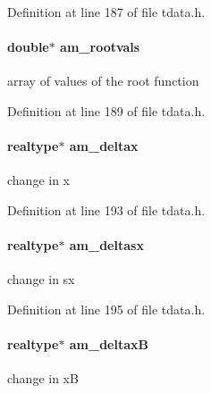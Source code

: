 Definition at line 187 of file tdata.\+h.

\hypertarget{struct_temp_data_a9cf09c47af8f82be3bba711720009efe}{}
\paragraph[{am\+\_\+rootvals}]{\setlength{\rightskip}{0pt plus 5cm}double$\ast$ am\+\_\+rootvals}\label{struct_temp_data_a9cf09c47af8f82be3bba711720009efe}
array of values of the root function 

Definition at line 189 of file tdata.\+h.

\hypertarget{struct_temp_data_ab432281618cfe0f7dd7db1d8eb5ec227}{}
\paragraph[{am\+\_\+deltax}]{\setlength{\rightskip}{0pt plus 5cm}realtype$\ast$ am\+\_\+deltax}\label{struct_temp_data_ab432281618cfe0f7dd7db1d8eb5ec227}
change in x 

Definition at line 193 of file tdata.\+h.

\hypertarget{struct_temp_data_a96e5e38eb662e4b1390a14693e17ece5}{}
\paragraph[{am\+\_\+deltasx}]{\setlength{\rightskip}{0pt plus 5cm}realtype$\ast$ am\+\_\+deltasx}\label{struct_temp_data_a96e5e38eb662e4b1390a14693e17ece5}
change in sx 

Definition at line 195 of file tdata.\+h.

\hypertarget{struct_temp_data_a75047d78cee16ec77b9aae2cf0a25964}{}
\paragraph[{am\+\_\+deltax\+B}]{\setlength{\rightskip}{0pt plus 5cm}realtype$\ast$ am\+\_\+deltax\+B}\label{struct_temp_data_a75047d78cee16ec77b9aae2cf0a25964}
change in x\+B 

